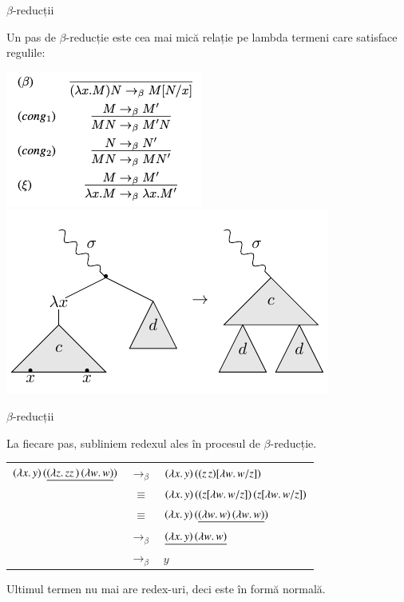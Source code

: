 \documentclass[xcolor=pdftex,romanian,colorlinks]{beamer}
\begin{document}
\begin{frame}[fragile]{$\beta$-reducții}

Un pas de $\beta$-reducție \intens{$\rightarrow_\beta$}  este cea mai mică relație pe lambda termeni care satisface regulile:

\begin{center}
\includegraphics[scale=.6]{images/beta-reduct}
\includegraphics[scale=.8]{images/beta-crop}
\end{center}

\end{frame}

\begin{frame}[fragile]{$\beta$-reducții}

La fiecare pas, subliniem redexul ales în procesul de $\beta$-reducție.

\begin{center}
\begin{tabular}{rcl}
$(\lambda x.\,y)\, (\underline{(\lambda z.\,zz\, )\, (\lambda w.\,w)})$ & $\rightarrow_\beta$ & $(\lambda x.\,y)\, ( (z\, z)[\lambda w.\,w/z] )$ \\ 
& $\equiv$ & $(\lambda x.\,y)\, ( (z[\lambda w.\,w/z])\, (z[\lambda w.\,w/z] )$ \\
& $\equiv$ & $(\lambda x.\,y)\, (\underline{(\lambda w.\,w)\, (\lambda w.\,w)})$ \\
& $\rightarrow_\beta$ & $\underline{(\lambda x.\,y)\, (\lambda w.\,w)}$ \\
& $\rightarrow_\beta$ & $y$ \\
\end{tabular}
\end{center}

Ultimul termen nu mai are redex-uri, deci este în formă normală.

\end{frame}
\end{document}
